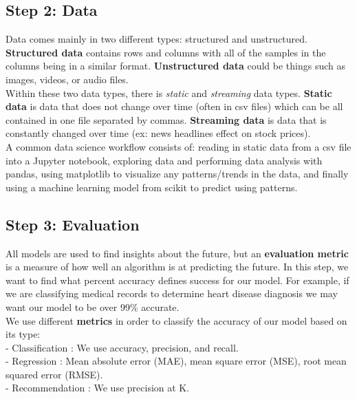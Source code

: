 \documentclass[11pt, a4paper]{article}
\begin{document}
\begin{spacing}{1.1}
	\subsection{Step 2: Data}
	Data comes mainly in two different types: structured and unstructured. \textbf{Structured data} contains rows and columns with all of the samples in the columns being in a similar format. \textbf{Unstructured data} could be things such as images, videos, or audio files. \vspace*{2mm} \\
	Within these two data types, there is \textit{static} and \textit{streaming} data types. \textbf{Static data} is data that does not change over time (often in csv files) which can be all contained in one file separated by commas. \textbf{Streaming data} is data that is constantly changed over time (ex: news headlines effect on stock prices).\vspace*{2mm}\\
	A common data science workflow consists of: reading in static data from a csv file into a Jupyter notebook, exploring data and performing data analysis with pandas, using matplotlib to visualize any patterns/trends in the data, and finally using a machine learning model from scikit to predict using patterns. \newpage

	\subsection{Step 3: Evaluation}
	All models are used to find insights about the future, but an \textbf{evaluation metric} is a measure of how well an algorithm is at predicting the future. In this step, we want to find what percent accuracy defines success for our model. For example, if we are classifying medical records to determine heart disease diagnosis we may want our model to be over 99\% accurate. \vspace*{2mm} \\
	We use different \textbf{metrics} in order to classify the accuracy of our model based on its type: \\
	\hspace*{2mm} - Classification : We use accuracy, precision, and recall. \\
	\hspace*{2mm} - Regression : Mean absolute error (MAE), mean square error (MSE), root mean squared error (RMSE). \\
	\hspace*{2mm} - Recommendation : We use precision at K.

\end{spacing}
\end{document}
